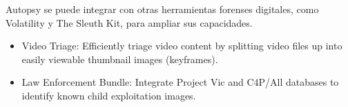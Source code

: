 \documentclass{article}
\begin{document}
Autopsy se puede integrar con otras herramientas forenses digitales, como Volatility y The Sleuth Kit, para ampliar sus capacidades.
\begin{itemize}
\item
Video Triage: Efficiently triage video content by splitting video files up into easily viewable thumbnail images (keyframes).
\item
Law Enforcement Bundle: Integrate Project Vic and C4P/All databases to identify known child exploitation images.
\end{itemize}
\end{document}
